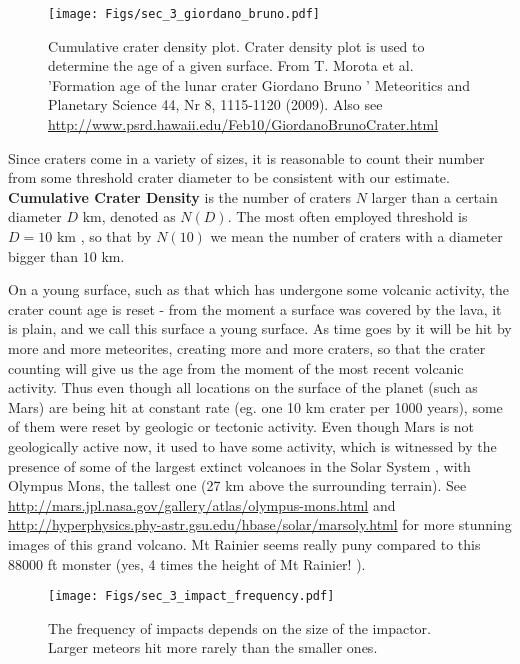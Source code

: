 \documentclass[paper=a4, fontsize=11pt]{scrartcl} %
\numberwithin{equation}{section} %
\begin{document}
\begin{figure*}
\centering
	\texttt{[image: Figs/sec\_3\_giordano\_bruno.pdf]}
	\caption[cum density]{Cumulative crater density plot. Crater density plot is used to determine the age of
a given surface. From T. Morota et al. 'Formation age of the lunar crater Giordano
Bruno '  Meteoritics and Planetary Science 44, Nr 8, 1115-1120 (2009). Also see
\url{http://www.psrd.hawaii.edu/Feb10/GiordanoBrunoCrater.html}}
	\label{fig:cum_density}
\end{figure*} 

Since craters come in a variety of sizes, it is reasonable to count their number from some
threshold crater diameter to be consistent with our estimate. \textbf{Cumulative Crater Density} is
the number of craters $N$ larger than a certain diameter $D$ km, denoted as $N(D)$. The most
often employed threshold is $D = 10$ km , so that by $N(10)$ we mean the number of craters
with a diameter bigger than $10$ km.


On a young surface, such as that which has undergone some volcanic activity, the crater count
age is reset - from the moment a surface was covered by the lava, it is plain, and we call this
surface a young surface. As time goes by it will be hit by more and more meteorites, creating
more and more craters, so that the crater counting will give us the age from the moment of
the most recent volcanic activity. Thus even though all locations on the surface of the planet
(such as Mars) are being hit at constant rate (eg. one 10 km crater per 1000 years), some of
them were reset by geologic or tectonic activity. Even though Mars is not geologically active
now, it used to have some activity, which is witnessed by the presence of some of the largest
extinct volcanoes in the Solar System , with Olympus Mons, the tallest one (27 km above the
surrounding terrain). See \url{http://mars.jpl.nasa.gov/gallery/atlas/olympus-mons.html}  and \url{http://hyperphysics.phy-astr.gsu.edu/hbase/solar/marsoly.html}  for more stunning images of this grand volcano. Mt Rainier seems really puny compared to this 88000 ft monster (yes,  4 times the height of Mt Rainier! ). 


\begin{figure*}
\centering
	\texttt{[image: Figs/sec\_3\_impact\_frequency.pdf]}
	\caption[impact rate]{The frequency of impacts depends on the size of the impactor. Larger meteors hit
more rarely than the smaller ones.}
	\label{fig:impact_rate}
\end{figure*}  
\end{document}
